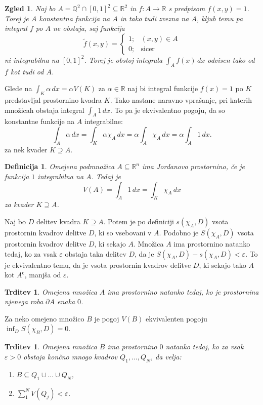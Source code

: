 \documentclass[10pt, a4paper]{article}
\newtheorem{trditev}[izr]{Trditev}
\newtheorem{defi}{Definicija}[section]
\newenvironment{noticeB}{%
  \tcolorbox[%
  notitle,
  empty,
  enhanced,  %
  breakable,
  coltext=black,
  colback=white, 
  fontupper=\rmfamily,
  parbox=false,
  noparskip,
  sharp corners,
  boxrule=-1pt,  %
  frame hidden,
  left=7pt,  %
  right=7pt,
  top=5pt,
  bottom=5pt,
  before skip=2.5ex plus 2pt,
  after skip=2.5ex plus 2pt,
  borderline west = {1.5pt}{-0.1pt}{blue!30!black}, %
  overlay unbroken and last={%
    \draw[color=black, line width=1.25pt]
    ($(frame.south west)+(1.pt, -0.1pt)$) -- ++(2em, 0);
  }
  ]}
{\endtcolorbox}
\newenvironment{definicija}{\begin{defi}\begin{noticeB}}{%
    \end{noticeB}\end{defi}}
\newtheorem{zgled}{Zgled}[section]
\newcommand{\stcomp}[1]{{#1}^{\mathsf{c}}}
\newcommand{\Q}{\mathbb {Q}}
\newcommand{\R}{\mathbb {R}}
\begin{document}
\begin{zgled}
    Naj bo $A = \Q^2 \cap [0, 1]^2 \subseteq \R^2$ in $f: A \to \R$ s predpisom $f(x, y) = 1$.
    Torej je $A$ konstantna funkcija na $A$ in tako tudi zvezna na $A$, kljub temu pa integral $f$ po $A$ 
    ne obstaja, saj funkcija 
    $$\widetilde{f} (x, y) = \begin{cases}
        1 ;& (x, y) \in A\\
        0 ;& \mathrm{sicer}
    \end{cases}$$ ni integrabilna na $[0, 1]^2$.
    Torej je obstoj integrala $\int_A f(x)\, dx$ odvisen tako od $f$ kot tudi od $A$.
\end{zgled}

Glede na $\int_K \alpha\, dx = \alpha V(K)$ za $\alpha \in \R$ 
naj bi integral funkcije $f(x) = 1$ po $K$ predstavljal prostornino kvadra $K$.
Tako nastane naravno vprašanje, pri katerih množicah obstaja integral $\int_A 1\, dx$.
To pa je ekvivalentno pogoju, da so konstantne funkcije na $A$ integrabilne:
$$\int_A \alpha\, dx = \int_K \alpha \chi_A\, dx = \alpha \int_A \chi_A\, dx = \alpha \int_A 1\, dx.$$
za nek kvader $K \supseteq A$.

\begin{definicija}
    Omejena podmnožica $A \subseteq \R^n$ ima Jordanovo prostornino,
    če je funkcija $1$ integrabilna na $A$. Tedaj je 
    $$V(A) = \int_A 1\, dx = \int_K \chi_A\, dx$$ za kvader $K \supseteq A$.
\end{definicija}

Naj bo $D$ delitev kvadra $K \supseteq A$.
Potem je po definiciji $s(\chi_A, D)$ vsota prostornin kvadrov delitve $D$, ki so vsebovani v $A$.
Podobno je $S(\chi_A, D)$ vsota prostornin kvadrov delitve $D$, ki sekajo $A$.
Množica $A$ ima prostornino natanko tedaj, ko za vsak $\varepsilon$ obstaja taka delitev $D$,
da je $S(\chi_A, D) - s(\chi_A, D) < \varepsilon$. To je ekvivalentno temu, 
da je vsota prostornin kvadrov delitve $D$, ki sekajo tako $A$ kot $\stcomp{A}$, manjša od $\varepsilon$.

\begin{trditev}\label{trd:1}
    Omejena množica $A$ ima prostornino natanko tedaj, ko je prostornina njenega roba $\partial A$ enaka $0$.
\end{trditev}

Za neko omejeno množico $B$ je pogoj $V(B)$ ekvivalenten pogoju $\inf_D S(\chi_B, D) = 0.$

\begin{trditev}
    Omejena množica $B$ ima prostornino $0$ natanko tedaj, ko za vsak $\varepsilon > 0$
    obstaja končno mnogo kvadrov $Q_1, \dots, Q_N$, da velja:
    \begin{enumerate}
        \item $B \subseteq Q_1 \cup \dots \cup Q_N$,
        \item $\sum_1 ^N V(Q_j) < \varepsilon$.
    \end{enumerate}
\end{trditev}
\end{document}
